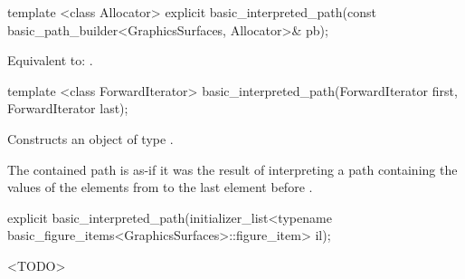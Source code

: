 %
\begin{itemdecl}
template <class Allocator>
explicit basic_interpreted_path(const basic_path_builder<GraphicsSurfaces, Allocator>& pb);
\end{itemdecl}
\begin{itemdescr}
\pnum
\effects
Equivalent to: .	
\end{itemdescr}

%
\begin{itemdecl}
template <class ForwardIterator>
basic_interpreted_path(ForwardIterator first, ForwardIterator last);
\end{itemdecl}
\begin{itemdescr}
\pnum
\effects
Constructs an object of type .

\pnum
The contained path is as-if it was the result of interpreting a path containing the values of the elements from  to the last element before .
%
%	
\end{itemdescr}

%
\begin{itemdecl}
explicit basic_interpreted_path(initializer_list<typename
  basic_figure_items<GraphicsSurfaces>::figure_item> il);
\end{itemdecl}
\begin{itemdescr}
\pnum
\effects
<TODO>
\end{itemdescr}


